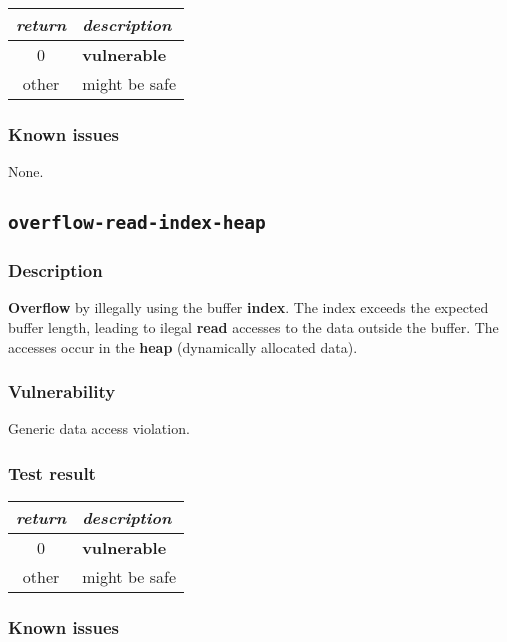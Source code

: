 \documentclass[a4paper]{book}
\begin{document}
\begin{tabular}{cl}
  \toprule
  \emph{return}  & \emph{description} \\
  \midrule
  0              & \textbf{vulnerable} \\
  other          & might be safe \\
  \bottomrule
\end{tabular}

\subsubsection{Known issues}

None.

\newpage

\subsection{\texttt{overflow-read-index-heap}}\label{test-overflow-read-index-heap}

\subsubsection{Description}

\textbf{Overflow} by illegally using the buffer \textbf{index}.
The index exceeds the expected buffer length,
leading to ilegal \textbf{read} accesses to the data outside the buffer.
The accesses occur in the \textbf{heap} (dynamically allocated data).

\subsubsection{Vulnerability}
Generic data access violation.

\subsubsection{Test result}

\begin{tabular}{cl}
  \toprule
  \emph{return}  & \emph{description} \\
  \midrule
  0              & \textbf{vulnerable} \\
  other          & might be safe \\
  \bottomrule
\end{tabular}

\subsubsection{Known issues}
\end{document}
